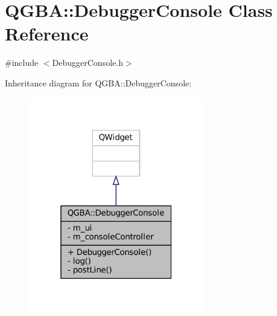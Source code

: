 \hypertarget{class_q_g_b_a_1_1_debugger_console}{}\section{Q\+G\+BA\+:\+:Debugger\+Console Class Reference}
\label{class_q_g_b_a_1_1_debugger_console}


{\ttfamily \#include $<$Debugger\+Console.\+h$>$}



Inheritance diagram for Q\+G\+BA\+:\+:Debugger\+Console\+:
\nopagebreak
\begin{figure}[H]
\begin{center}
\leavevmode
\includegraphics[width=217pt]{class_q_g_b_a_1_1_debugger_console__inherit__graph}
\end{center}
\end{figure}


